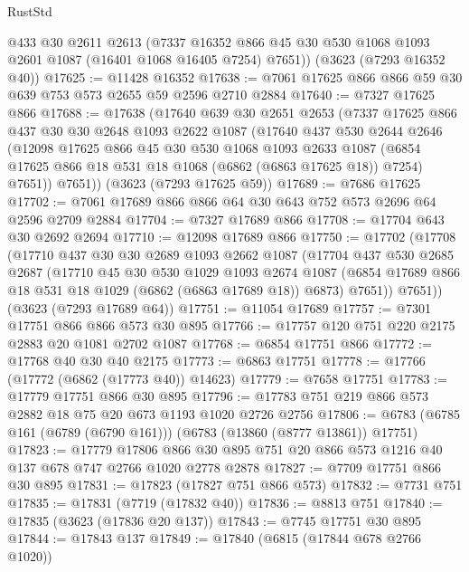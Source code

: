 \begin{lexlean}{RustStd}
\begin{coremodule}
      @433
      @30
      @2611
      @2613
      (@7337 @16352 @866 @45 @30 @530 @1068 @1093 @2601 @1087 (@16401 @1068 @16405 @7254) @7651))
    (@3623 (@7293 @16352 @40))
@17625 := @11428 @16352
@17638 := @7061 @17625 @866 @866 @59 @30 @639 @753 @573 @2655 @59 @2596 @2710 @2884
@17640 := @7327 @17625 @866
@17688 := @17638
    (@17640
      @639
      @30
      @2651
      @2653
      (@7337
        @17625
        @866
        @437
        @30
        @30
        @2648
        @1093
        @2622
        @1087
        (@17640
          @437
          @530
          @2644
          @2646
          (@12098
            @17625
            @866
            @45
            @30
            @530
            @1068
            @1093
            @2633
            @1087
            (@6854 @17625 @866 @18 @531 @18 @1068 (@6862 (@6863 @17625 @18)) @7254)
            @7651))
        @7651))
    (@3623 (@7293 @17625 @59))
@17689 := @7686 @17625
@17702 := @7061 @17689 @866 @866 @64 @30 @643 @752 @573 @2696 @64 @2596 @2709 @2884
@17704 := @7327 @17689 @866
@17708 := @17704 @643 @30 @2692 @2694
@17710 := @12098 @17689 @866
@17750 := @17702
    (@17708
      (@17710
        @437
        @30
        @30
        @2689
        @1093
        @2662
        @1087
        (@17704
          @437
          @530
          @2685
          @2687
          (@17710
            @45
            @30
            @530
            @1029
            @1093
            @2674
            @1087
            (@6854 @17689 @866 @18 @531 @18 @1029 (@6862 (@6863 @17689 @18)) @6873)
            @7651))
        @7651))
    (@3623 (@7293 @17689 @64))
@17751 := @11054 @17689
@17757 := @7301 @17751 @866 @866 @573 @30 @895
@17766 := @17757 @120 @751 @220 @2175 @2883 @20 @1081 @2702 @1087
@17768 := @6854 @17751 @866
@17772 := @17768 @40 @30 @40 @2175
@17773 := @6863 @17751
@17778 := @17766 (@17772 (@6862 (@17773 @40)) @14623)
@17779 := @7658 @17751
@17783 := @17779 @17751 @866 @30 @895
@17796 := @17783 @751 @219 @866 @573 @2882 @18 @75 @20 @673 @1193 @1020 @2726 @2756
@17806 := @6783 (@6785 @161 (@6789 (@6790 @161))) (@6783 (@13860 (@8777 @13861)) @17751)
@17823 := @17779
    @17806
    @866
    @30
    @895
    @751
    @20
    @866
    @573
    @1216
    @40
    @137
    @678
    @747
    @2766
    @1020
    @2778
    @2878
@17827 := @7709 @17751 @866 @30 @895
@17831 := @17823 (@17827 @751 @866 @573)
@17832 := @7731 @751
@17835 := @17831 (@7719 (@17832 @40))
@17836 := @8813 @751
@17840 := @17835 (@3623 (@17836 @20 @137))
@17843 := @7745 @17751 @30 @895
@17844 := @17843 @137
@17849 := @17840 (@6815 (@17844 @678 @2766 @1020))

\end{coremodule}
\end{lexlean}
